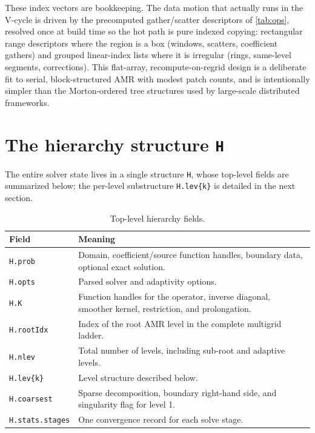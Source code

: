 \documentclass[11pt,oneside,openany]{book}
\newcommand{\code}[1]{\textnormal{\texttt{#1}}}
\begin{document}
These index vectors are bookkeeping. The data motion that actually runs in the V-cycle is driven by the precomputed gather/scatter descriptors of \cref{tab:ops}, resolved once at build time so the hot path is pure indexed copying: rectangular range descriptors where the region is a box (windows, scatters, coefficient gathers) and grouped linear-index lists where it is irregular (rings, same-level segments, corrections). This flat-array, recompute-on-regrid design is a deliberate fit to serial, block-structured AMR with modest patch counts, and is intentionally simpler than the Morton-ordered tree structures used by large-scale distributed frameworks.

\section{The hierarchy structure \code{H}}
The entire solver state lives in a single structure \code{H}, whose top-level fields are summarized below; the per-level substructure \code{H.lev\{k\}} is detailed in the next section.
\begin{table}[htbp]
\centering
\small
\begin{tabularx}{\textwidth}{@{}p{}X@{}}
\toprule
Field & Meaning \\
\midrule
\code{H.prob} & Domain, coefficient/source function handles, boundary data, optional exact solution. \\
\code{H.opts} & Parsed solver and adaptivity options. \\
\code{H.K} & Function handles for the operator, inverse diagonal, smoother kernel, restriction, and prolongation. \\
\code{H.rootIdx} & Index of the root AMR level in the complete multigrid ladder. \\
\code{H.nlev} & Total number of levels, including sub-root and adaptive levels. \\
\code{H.lev\{k\}} & Level structure described below. \\
\code{H.coarsest} & Sparse decomposition, boundary right-hand side, and singularity flag for level 1. \\
\code{H.stats.stages} & One convergence record for each solve stage. \\
\bottomrule
\end{tabularx}
\caption{Top-level hierarchy fields.}
\end{table}
\end{document}
